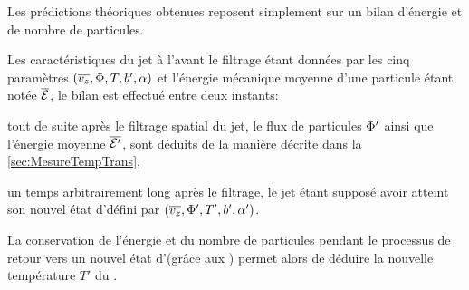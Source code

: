 Les prédictions théoriques obtenues reposent simplement sur un bilan d'énergie et de nombre de particules. 
{
Les caractéristiques du jet à l'\eqthdy avant le filtrage étant données par les cinq paramètres $({\overline{v_z}}, {\Phi}, T, {b'}, \alpha)$ et l'énergie mécanique moyenne d'une particule étant notée $\overline{{\mathcal{E}}}$, le bilan est effectué entre deux instants:
\begin{itemizel}
	\item tout de suite après le filtrage spatial du jet, le flux de particules ${{\Phi}'}$ ainsi que l'énergie moyenne $\overline{{\mathcal{E}}'}$, sont déduits de la manière décrite dans la \autoref{sec:MesureTempTrans},
	\item un temps arbitrairement long après le filtrage, le jet étant supposé avoir atteint son nouvel état d'\eqthdy défini par $({\overline{v_z}}, {{\Phi}'}, T', {b'}, \alpha')$.
\end{itemizel} 
La conservation de l'énergie et du nombre de particules pendant le processus de retour vers un nouvel état d'\eqthdy (grâce aux \colels) permet alors de déduire la nouvelle température $T'$ du \jat.
}

